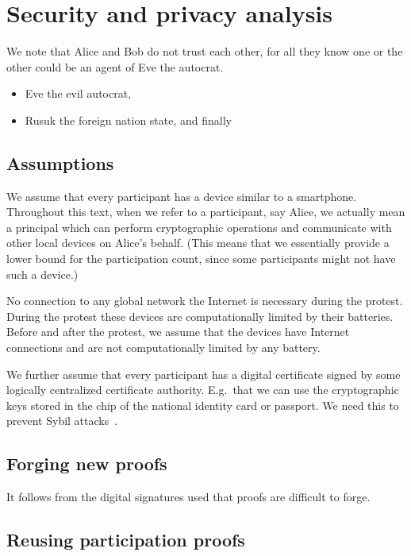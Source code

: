 \section{Security and privacy analysis}%
\label{SecurityAnalysis}

We note that Alice and Bob do not trust each other, for all they know one or the 
other could be an agent of Eve the autocrat.
\begin{itemize}
  \item Eve the evil autocrat,
  \item Rusuk the foreign nation state, and finally
\end{itemize}

\subsection{Assumptions} \label{assumptions}

We assume that every participant has a device similar to a smartphone.
Throughout this text, when we refer to a participant, say Alice, we actually 
mean a principal which can perform cryptographic operations and communicate with 
other local devices on Alice's behalf.
(This means that we essentially provide a lower bound for the participation 
count, since some participants might not have such a device.)

No connection to any global network the Internet is necessary during the 
protest.
During the protest these devices are computationally limited by their 
batteries.
Before and after the protest, we assume that the devices have Internet 
connections and are not computationally limited by any battery.

We further assume that every participant has a digital certificate signed by 
some logically centralized certificate authority.
E.g.\ that we can use the cryptographic keys stored in the chip of the national 
identity card or passport.
We need this to prevent Sybil attacks~\cite{SybilAttack}.

\subsection{Forging new proofs}

It follows from the digital signatures used that proofs are difficult to forge.

\subsection{Reusing participation proofs}

